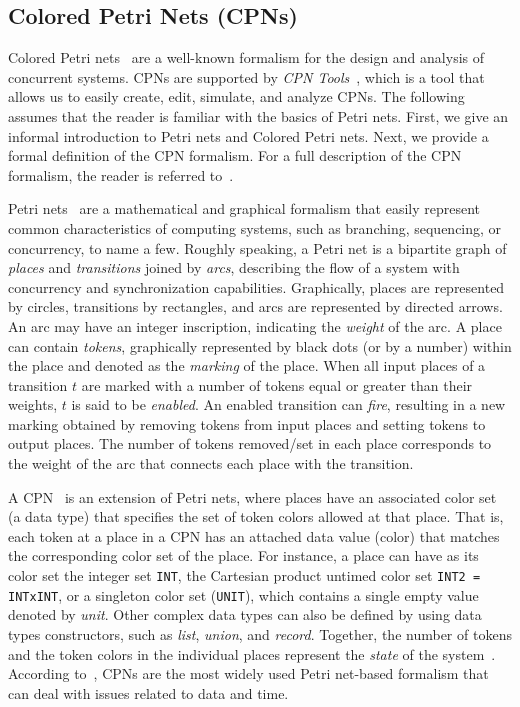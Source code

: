 \subsection{Colored Petri Nets (CPNs)}

Colored Petri nets~\cite{jensen2009coloured} are a well-known formalism for the design and analysis of concurrent systems. CPNs are supported by {\em CPN Tools}~\cite{ratzer2003cpn}, which is a tool that allows us to easily create, edit, simulate, and analyze CPNs. The following assumes that the reader is familiar with the basics of Petri nets. First, we give an informal introduction to Petri nets and Colored Petri nets. Next, we provide a formal definition
of the CPN formalism. For a full description of the CPN formalism, the reader is referred to~\cite{jensen2009coloured}.

Petri nets~\cite{Murata89} are a mathematical and graphical formalism that easily represent common characteristics of computing systems, such as branching, sequencing, or concurrency, to name a few. Roughly speaking, a Petri net is a bipartite graph of {\em places} and {\em transitions} joined by {\em arcs}, describing the flow of a system with concurrency and synchronization capabilities. Graphically, places are represented by circles, transitions by rectangles, and arcs are represented by directed arrows. An arc may have an integer inscription, indicating the {\em weight} of the arc. A place can contain {\em tokens}, graphically represented by black dots (or by a number) within the place and denoted as the {\em marking} of the place. When all input places of a transition $t$ are marked with a number of tokens equal or greater than their weights, $t$ is said to be {\em enabled}. An enabled transition can {\em fire}, resulting in a new marking obtained by removing tokens from input places and setting tokens to output places. The number of tokens removed/set in each place corresponds to the weight of the arc that connects each place with the transition.

A CPN~\cite{jensen2009coloured} is an extension of Petri nets, where places have an associated color set (a data type) that specifies the set of token colors  allowed at that place. That is, each token at a place in a CPN has an attached data value (color) that matches the corresponding color set of the place. For instance, a place can have as its color set the integer set {\tt INT}, the Cartesian product untimed color set {\tt INT2 = INTxINT}, or a singleton color set ({\tt UNIT}), which contains a single empty value denoted by {\em unit}. Other complex data types can also be defined by using data types constructors, such as {\em list}, {\em union}, and {\em record}. Together, the number of tokens and the token colors in the individual places represent the {\em state} of the system~\cite{gomez2019profiling}. According to~\cite{vanderAalst2016}, CPNs are the most widely used Petri net-based formalism that can deal with issues related to data and time.

